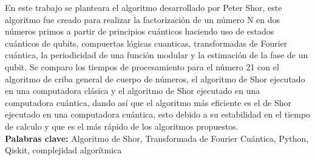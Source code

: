 En este trabajo se planteara el algoritmo desarrollado por Peter Shor, este algoritmo fue creado para realizar la factorización de un número 
N en dos números primos a partir de principios cuánticos haciendo uso de estados cuánticos de qubits, compuertas lógicas cuanticas, transformadas de Fourier cuántica,
la periodicidad de una función modular y la estimación de la fase de un qubit. Se comparo los tiempos de procesamiento para el número 21 con el algoritmo de criba general de cuerpo
de números, el algoritmo de Shor ejecutado en una computadora clásica y el algoritmo de Shor ejecutado en una computadora cuántica, dando así que el algoritmo más eficiente
es el de Shor ejecutado en una computadora cuántica, esto debido a su estabilidad en el tiempo de calculo y que es el más rápido de los algoritmos propuestos.\\
\textbf{Palabras clave:} Algoritmo de Shor, Transformada de Fourier Cuántica, Python, Qiskit, complejidad algorítmica 